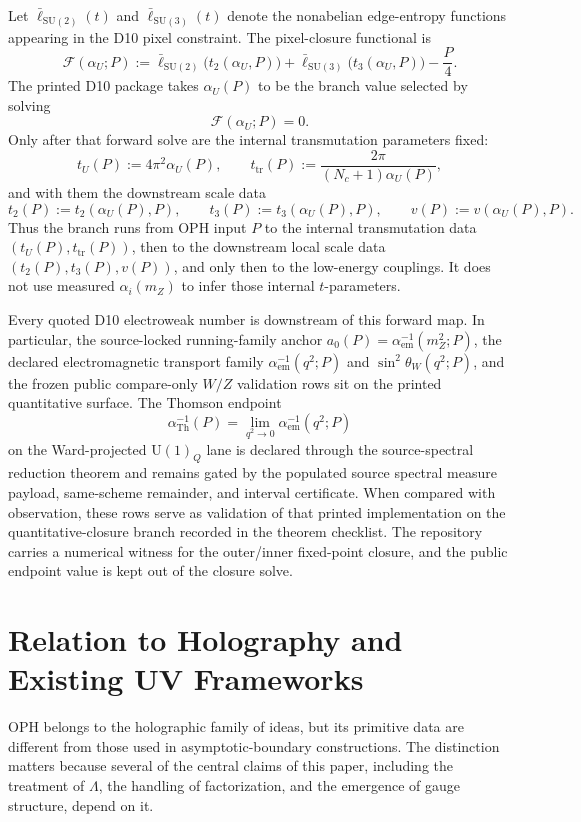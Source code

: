 \documentclass[11pt]{article}
\newcommand{\SU}{\mathrm{SU}}
\newcommand{\U}{\mathrm{U}}
\begin{document}
Let \(\bar\ell_{\SU(2)}(t)\) and \(\bar\ell_{\SU(3)}(t)\) denote the nonabelian edge-entropy functions appearing in the D10 pixel constraint. The pixel-closure functional is
\[
\mathcal F(\alpha_U;P)
:=
\bar\ell_{\SU(2)}\!\bigl(t_2(\alpha_U,P)\bigr)
+
\bar\ell_{\SU(3)}\!\bigl(t_3(\alpha_U,P)\bigr)
-\frac{P}{4}.
\]
The printed D10 package takes \(\alpha_U(P)\) to be the branch value selected by solving
\[
\mathcal F(\alpha_U;P)=0.
\]
Only after that forward solve are the internal transmutation parameters fixed:
\[
t_U(P):=4\pi^2\alpha_U(P),
\qquad
t_{\mathrm{tr}}(P):=\frac{2\pi}{(N_c+1)\alpha_U(P)},
\]
and with them the downstream scale data
\[
t_2(P):=t_2(\alpha_U(P),P),
\qquad
t_3(P):=t_3(\alpha_U(P),P),
\qquad
v(P):=v(\alpha_U(P),P).
\]
Thus the branch runs from OPH input \(P\) to the internal transmutation data
\((t_U(P),t_{\mathrm{tr}}(P))\), then to the downstream local scale data
\((t_2(P),t_3(P),v(P))\), and only then to the low-energy couplings. It does not use measured
\(\alpha_i(m_Z)\) to infer those internal \(t\)-parameters.

Every quoted D10 electroweak number is downstream of this forward map. In particular, the
source-locked running-family anchor \(a_0(P)=\alpha_{\mathrm{em}}^{-1}(m_Z^2;P)\), the
declared electromagnetic transport family \(\alpha_{\mathrm{em}}^{-1}(q^2;P)\) and \(\sin^2\theta_W(q^2;P)\), and the frozen public
compare-only \(W/Z\) validation rows sit on the printed quantitative surface. The Thomson endpoint
\[
\alpha_{\mathrm{Th}}^{-1}(P)=\lim_{q^2\to0}\alpha_{\mathrm{em}}^{-1}(q^2;P)
\]
on the Ward-projected \(\U(1)_Q\) lane is declared through the
source-spectral reduction theorem and remains gated by the populated source
spectral measure payload, same-scheme remainder, and interval certificate. When compared with observation, these rows serve as validation of that printed
implementation on the quantitative-closure branch recorded in the theorem checklist. The repository
carries a numerical witness for the outer/inner fixed-point closure, and the public endpoint
value is kept out of the closure solve.

\section{Relation to Holography and Existing UV Frameworks}

OPH belongs to the holographic family of ideas, but its primitive data are different from those used in asymptotic-boundary constructions. The distinction matters because several of the central claims of this paper, including the treatment of $\Lambda$, the handling of factorization, and the emergence of gauge structure, depend on it.
\end{document}
